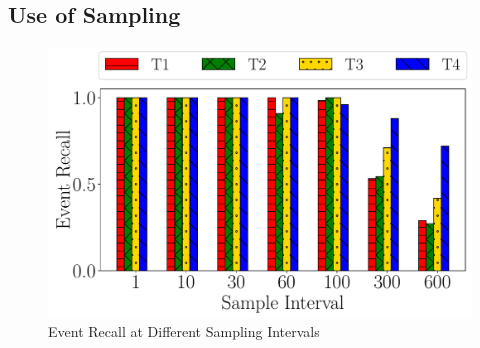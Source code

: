 \subsection{Use of Sampling}

\begin{figure}[h]
    \centering
    \includegraphics[width=.9\linewidth]{FIGS/fig-random-select-interval-recall-hatch.pdf}
\caption{Event Recall at Different Sampling Intervals}
\label{fig:sampling-only}
\end{figure}


